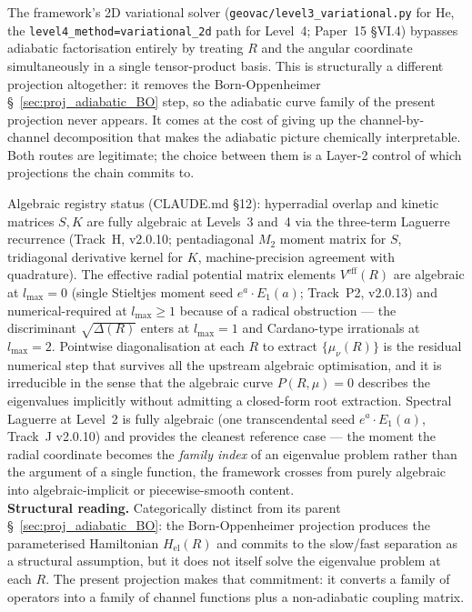 The framework's 2D variational solver
(\texttt{geovac/level3\_variational.py} for He, the
\texttt{level4\_method=\textquotesingle variational\_2d\textquotesingle}
path for Level~4; Paper~15 §VI.4) bypasses adiabatic factorisation
entirely by treating $R$ and the angular coordinate simultaneously in
a single tensor-product basis.  This is structurally a different
projection altogether: it removes the Born-Oppenheimer
\S~\ref{sec:proj_adiabatic_BO} step, so the adiabatic curve
family of the present projection never appears.  It comes at the cost
of giving up the channel-by-channel decomposition that makes the
adiabatic picture chemically interpretable.  Both routes are
legitimate; the choice between them is a Layer-2 control of which
projections the chain commits to.

Algebraic registry status (CLAUDE.md §12): hyperradial overlap and
kinetic matrices $S, K$ are fully algebraic at Levels~3 and~4 via the
three-term Laguerre recurrence (Track~H, v2.0.10; pentadiagonal $M_2$
moment matrix for $S$, tridiagonal derivative kernel for $K$,
machine-precision agreement with quadrature).  The effective radial
potential matrix elements $V^\text{eff}(R)$ are algebraic at
$l_\text{max} = 0$ (single Stieltjes moment seed $e^a \cdot E_1(a)$;
Track~P2, v2.0.13) and numerical-required at $l_\text{max} \geq 1$
because of a radical obstruction --- the discriminant $\sqrt{\Delta(R)}$
enters at $l_\text{max}=1$ and Cardano-type irrationals at
$l_\text{max}=2$.  Pointwise diagonalisation at each $R$ to extract
$\{\mu_\nu(R)\}$ is the residual numerical step that survives all the
upstream algebraic optimisation, and it is irreducible in the sense
that the algebraic curve $P(R, \mu) = 0$ describes the eigenvalues
implicitly without admitting a closed-form root extraction.  Spectral
Laguerre at Level~2 is fully algebraic (one transcendental seed
$e^a \cdot E_1(a)$, Track~J v2.0.10) and provides the cleanest
reference case --- the moment the radial coordinate becomes the
\emph{family index} of an eigenvalue problem rather than the argument
of a single function, the framework crosses from purely algebraic
into algebraic-implicit or piecewise-smooth content.\\
\textbf{Structural reading.}  Categorically distinct from its parent
\S~\ref{sec:proj_adiabatic_BO}: the Born-Oppenheimer projection
produces the parameterised Hamiltonian $H_\text{el}(R)$ and commits to
the slow/fast separation as a structural assumption, but it does not
itself solve the eigenvalue problem at each $R$.  The present
projection makes that commitment: it converts a family of operators
into a family of channel functions plus a non-adiabatic coupling
matrix.

